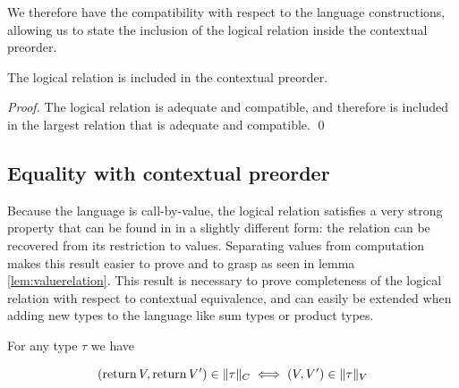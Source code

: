 We therefore have the compatibility with respect to the language constructions, 
allowing us to state the inclusion of the logical relation inside the contextual
preorder.

\begin{theorem}
    \label{thm:inclusionpreorder}
    The logical relation is included in the contextual preorder.
\end{theorem}

\begin{proof}
    The logical relation is adequate and compatible, and 
    therefore is included in the largest relation that 
    is adequate and compatible.
\qed\end{proof}

\subsection{Equality with contextual preorder}

Because the language is call-by-value, the logical 
relation satisfies a very strong property that 
can be found in \cite{pitts1998existential} in a slightly different form:
the relation can be recovered from its restriction to values.
Separating values from computation makes this result easier to 
prove and to grasp as seen in lemma \ref{lem:valuerelation}.
This result is necessary to prove completeness of the logical 
relation with respect to contextual equivalence, and can easily 
be extended when adding new types to the language like sum types 
or product types.

\begin{lemma}
    \label{lem:valuerelation}
    For any type $\tau$ we have 

    \begin{equation*}
        (\operatorname{return} V, \operatorname{return} V') \in \| \tau \|_C
        \iff 
        (V,V') \in \| \tau \|_V
    \end{equation*}
\end{lemma}

